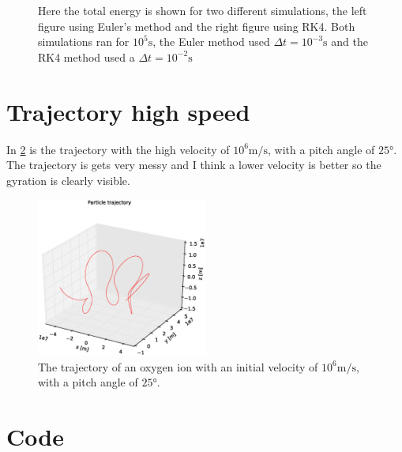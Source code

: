 \documentclass[x11names]{article}
\begin{document}
\begin{figure}[ht]
\begin{subfigure}{0.45\textwidth}
      \end{subfigure}
      \caption{Here the total energy is shown for two different simulations, the left figure using Euler's method and the right figure using RK4. Both simulations ran for \(10^5 \si{\second}\), the Euler method used \(\Delta t = 10^{-3} \si{\second}\) and the RK4 method used a \(\Delta t = 10^{-2} \si{\second}\)}
      \label{fig:totE}
    \end{figure}

    

\section{ Trajectory high speed }
  \label{sec:high_vel}
    In \cref{fig:high_vel} is the trajectory with the high velocity of \(10^6 \si{\meter\per\second}\), with a pitch angle of \(25\si{\degree}\). The trajectory is gets very messy and I think a lower velocity is better so the gyration is clearly visible.

    \begin{figure}
      \centering 
      \includegraphics[width = 0.5\textwidth]{figures/rk4_3D_v6}
      \caption{The trajectory of an oxygen ion with an initial velocity of \(10^6 \si{\meter\per\second}\), with a pitch angle of \(25\si{\degree}\).}
      \label{fig:high_vel}
    \end{figure}




\section{Code}
  \label{sec:code}
  

      
\end{document}
